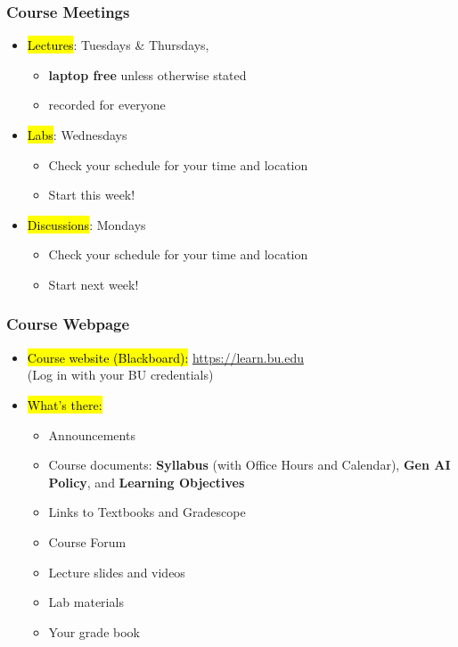 \documentclass[slidestop,compress,mathserif]{beamer}
\begin{document}
\begin{frame}
	\frametitle{Course Meetings}
	\begin{itemize}
		\item \hl{Lectures}: Tuesdays \& Thursdays, 
		\begin{itemize}
			\item \textbf{laptop free} unless otherwise stated 
			\item recorded for everyone 
		\end{itemize}
		\item \hl{Labs}: Wednesdays
		\begin{itemize}
			\item Check your schedule for your time and location
			\item Start this week!
		\end{itemize}
		\item \hl{Discussions}: Mondays
		\begin{itemize}
			\item Check your schedule for your time and location
			\item Start next week!
		\end{itemize}
	\end{itemize}
\end{frame}

\begin{frame}
	\frametitle{Course Webpage} 
	\begin{itemize}
		\item \hl{Course website (Blackboard):} \url{https://learn.bu.edu} \\
		(Log in with your BU credentials)
		\item \hl{What's there:}
		\begin{itemize}
			\item Announcements
			\item Course documents: \textbf{Syllabus} (with Office Hours and Calendar), \textbf{Gen AI Policy}, and \textbf{Learning Objectives}
			\item Links to Textbooks and Gradescope
			\item Course Forum
			\item Lecture slides and videos
			\item Lab materials
			\item Your grade book
		\end{itemize}
	\end{itemize}	
\end{frame}
\end{document}
